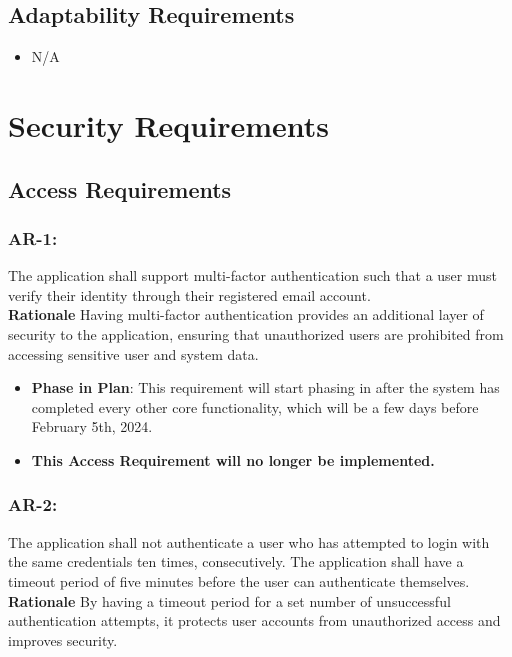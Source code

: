 \documentclass[12pt]{article}
\begin{document}
\subsection{Adaptability Requirements}
\begin{itemize}
    \item N/A
\end{itemize}

\section{Security Requirements}
\subsection{Access Requirements}

\subsubsection*{AR-1:}
The application shall support multi-factor authentication such that a user must verify their identity through their registered email account. \\
\textbf{Rationale} Having multi-factor authentication provides an additional layer of security to the application, ensuring that unauthorized users are prohibited from accessing sensitive user and system data.
 \begin{itemize}
         \item \textbf{Phase in Plan}: This requirement will start phasing in after the system has completed every other core functionality, which will be a few days before February 5th, 2024.
         \item\textbf{This Access Requirement will no longer be implemented.}

    \end{itemize}


\subsubsection*{AR-2:}
The application shall not authenticate a user who has attempted to login with the same credentials ten times, consecutively. The application shall have a timeout period of five minutes before the user can authenticate themselves. \\
\textbf{Rationale} By having a timeout period for a set number of unsuccessful authentication attempts, it protects user accounts from unauthorized access and improves security.
\end{document}
